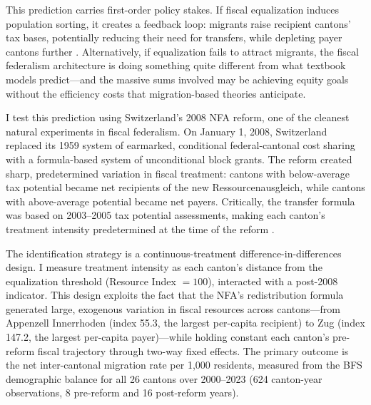 \documentclass[12pt]{article}
\begin{document}
This prediction carries first-order policy stakes. If fiscal equalization induces population sorting, it creates a feedback loop: migrants raise recipient cantons' tax bases, potentially reducing their need for transfers, while depleting payer cantons further \citep{oates1972fiscal}. Alternatively, if equalization fails to attract migrants, the fiscal federalism architecture is doing something quite different from what textbook models predict---and the massive sums involved may be achieving equity goals without the efficiency costs that migration-based theories anticipate.

I test this prediction using Switzerland's 2008 NFA reform, one of the cleanest natural experiments in fiscal federalism. On January 1, 2008, Switzerland replaced its 1959 system of earmarked, conditional federal-cantonal cost sharing with a formula-based system of unconditional block grants. The reform created sharp, predetermined variation in fiscal treatment: cantons with below-average tax potential became net recipients of the new Ressourcenausgleich, while cantons with above-average potential became net payers. Critically, the transfer formula was based on 2003--2005 tax potential assessments, making each canton's treatment intensity predetermined at the time of the reform \citep{dafflon2004fiscal, frey2008new}.

The identification strategy is a continuous-treatment difference-in-differences design. I measure treatment intensity as each canton's distance from the equalization threshold (Resource Index $= 100$), interacted with a post-2008 indicator. This design exploits the fact that the NFA's redistribution formula generated large, exogenous variation in fiscal resources across cantons---from Appenzell Innerrhoden (index 55.3, the largest per-capita recipient) to Zug (index 147.2, the largest per-capita payer)---while holding constant each canton's pre-reform fiscal trajectory through two-way fixed effects. The primary outcome is the net inter-cantonal migration rate per 1,000 residents, measured from the BFS demographic balance for all 26 cantons over 2000--2023 (624 canton-year observations, 8 pre-reform and 16 post-reform years).
\end{document}
